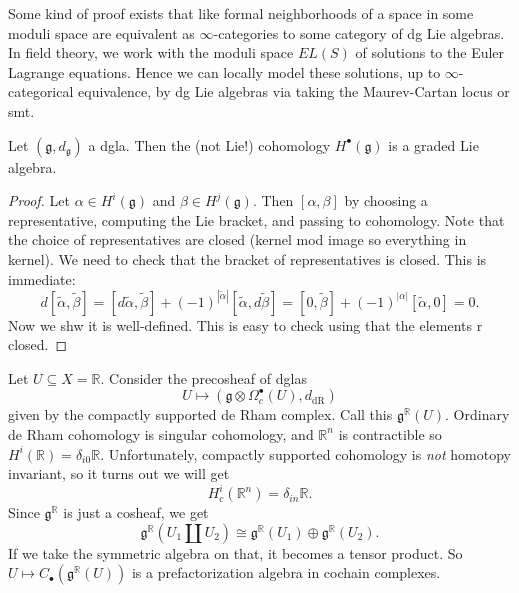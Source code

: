 Some kind of proof exists that like formal neighborhoods of a space in some moduli space are equivalent as $\infty $-categories to some category of dg Lie algebras. In field theory, we work with the moduli space $EL(S)$ of solutions to the Euler Lagrange equations. Hence we can locally model these solutions, up to $\infty $-categorical equivalence, by dg Lie algebras via taking the Maurev-Cartan locus or smt.

\begin{proposition}\label{prad}
	Let $(\mathfrak{g} ,d_\mathfrak{g} )$ a dgla. Then the (not Lie!) cohomology $H^{\bullet} (\mathfrak{g})$ is a graded Lie algebra.
\end{proposition}
\begin{proof}
	Let $\alpha \in H^i(\mathfrak{g} )$ and $\beta \in H^j(\mathfrak{g} )$. Then $[\alpha ,\beta ]$ by choosing a representative, computing the Lie bracket, and passing to cohomology. Note that the choice of representatives are closed (kernel mod image so everything in kernel). We need to check that the bracket of representatives is closed. This is immediate:
	\[
		d[ \widetilde{\alpha } ,\widetilde{\beta } ]=[d \widetilde{\alpha } ,\widetilde{\beta } ]+(-1)^{\left| \widetilde{\alpha }  \right| } [ \widetilde{\alpha } ,d \widetilde{\beta } ]=[0,\widetilde{\beta } ] + (-1)^{\left| \alpha  \right| } [ \widetilde{\alpha } ,0]=0
	.\]
	Now we shw it is well-defined. This is easy to check using that the elements r closed.
\end{proof}


Let $U\subseteq X=\mathbb{R} $. Consider the precosheaf of dglas
\[
	U\mapsto (\mathfrak{g} \otimes \Omega _c^{\bullet}(U),d_{\mathrm{dR} } )
\]
given by the compactly supported de Rham complex. Call this $\mathfrak{g} ^{\mathbb{R} } (U)$. Ordinary de Rham cohomology is singular cohomology, and $\mathbb{R} ^n$ is contractible so $H^i(\mathbb{R} )=\delta _{i0} \mathbb{R} $. Unfortunately, compactly supported cohomology is \emph{not} homotopy invariant, so it turns out we will get
\[
	H^i_c(\mathbb{R} ^n)=\delta_{in} \mathbb{R} 
.\]
Since $\mathfrak{g} ^\mathbb{R} $ is just a cosheaf, we get
\[
	\mathfrak{g} ^\mathbb{R} (U_1 \amalg U_2)\cong \mathfrak{g} ^\mathbb{R} (U_1)\oplus \mathfrak{g} ^\mathbb{R} (U_2)
.\]
If we take the symmetric algebra on that, it becomes a tensor product. So $U\mapsto C_{\bullet} (\mathfrak{g} ^\mathbb{R} (U))$ is a prefactorization algebra in cochain complexes.

